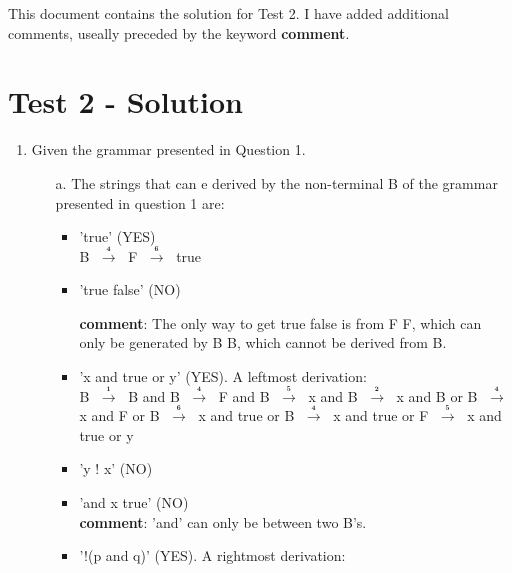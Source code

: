\documentclass{article}
\newcommand{\regla}[1]{$\;\mathbf{\stackrel{{}_{#1}}{\longrightarrow}}\;$}
\newcommand{\comment}{\textbf{comment}}
\begin{document}
\thispagestyle{empty}

\newcommand{\negra}[1]{\textbf{#1}}


This document contains the solution for Test 2. I have added additional comments, useally preceded by the keyword \comment.


\section*{Test 2 - Solution}

\begin{enumerate}

\item Given the grammar presented in Question 1.

\begin{itemize}
\item[a.] The strings that can e derived by the non-terminal B of the grammar presented in question 1 are:

\begin{itemize}
\item 'true' (YES) \\

B \regla{4} F \regla{6} true \\

\item 'true false' (NO) 

\comment: The only way to get true false is from F F, which can only be generated by B B, which cannot be derived from B. \\

\item 'x and true or y' (YES). A leftmost derivation: \\

B \regla{1} B and B \regla{4} F and B \regla{5} x and B \regla{2} x and B or B \regla{4} x and F or B \regla{6} x and true or B \regla{4} x and true or F \regla{5} x and true or y \\

\item 'y ! x' (NO)  \\

\item 'and x true' (NO) \\
\comment: 'and' can only be between two B's. \\

\item '!(p and q)' (YES). A rightmost derivation:\\


\end{itemize}
\end{itemize}
\end{enumerate}
\end{document}
